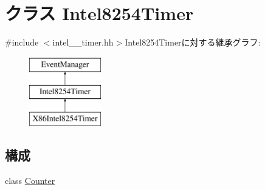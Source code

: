 \hypertarget{classIntel8254Timer}{
\section{クラス Intel8254Timer}
\label{classIntel8254Timer}
}


{\ttfamily \#include $<$intel\_\_\-timer.hh$>$}Intel8254Timerに対する継承グラフ:\begin{figure}[H]
\begin{center}
\leavevmode
\includegraphics[height=3cm]{classIntel8254Timer}
\end{center}
\end{figure}
\subsection*{構成}
\begin{DoxyCompactItemize}
\item 
class \hyperlink{classIntel8254Timer_1_1Counter}{Counter}
\end{DoxyCompactItemize}
